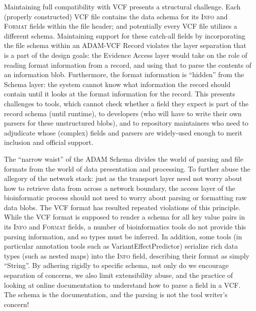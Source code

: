 \documentclass[10pt,twocolumn]{article}
\theoremstyle{plain}
\begin{document}
Maintaining full compatibility with VCF presents a structural challenge. Each (properly constructed) VCF file contains the data schema for
its \textsc{Info} and \textsc{Format} fields within the file header; and potentially every VCF file utilizes a different schema. Maintaining support
for these catch-all fields by incorporating the file schema within an ADAM-VCF Record violates the layer separation that is a part of the design
goals: the Evidence Access layer would take on the role of reading format information from a record, and using that to parse the contents of an
information blob. Furthermore, the format information is ``hidden'' from the Schema layer: the system cannot know what information the record
should contain until it looks at the format information for the record. This presents challenges to tools, which cannot check whether a field they
expect is part of the record schema (until runtime), to developers (who will have to write their own parsers for these unstructured blobs), and to
repository maintainers who need to adjudicate whose (complex) fields and parsers are widely-used enough to merit inclusion and official support.

The ``narrow waist'' of the ADAM Schema divides the world of parsing and file formats from the world of data presentation and processing.
To further abuse the allegory of the network stack: just as the transport layer need not worry about how to retrieve data from across a network
boundary, the access layer of the bioinformatic process should not need to worry about parsing or formatting raw data blobs. The VCF format
has resulted repeated violations of this principle. While the VCF format is supposed to render a schema for all key value pairs in its \textsc{Info}
and \textsc{Format} fields, a number of bioinformatics tools do not provide this parsing information, and so types must be inferred. In addition,
some tools (in particular annotation tools such as VariantEffectPredictor\cite{vep}) serialize rich data types (such as nested maps) into the
\textsc{Info} field, describing their format as simply ``String''. By adhering rigidly to specific schema, not only do we encourage separation of
concerns, we also limit extensibility abuse, and the practice of looking at online documentation to understand how to parse a field in a VCF.
The schema is the documentation, and the parsing is not the tool writer's concern!
\end{document}
